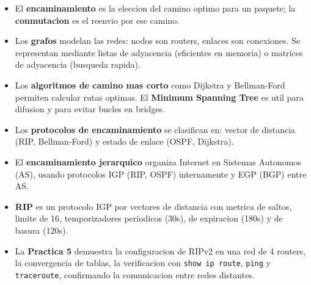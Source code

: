 \begin{itemize}
    \item El \textbf{encaminamiento} es la eleccion del camino optimo para un paquete;
    la \textbf{conmutacion} es el reenvio por ese camino.
    \item Los \textbf{grafos} modelan las redes: nodos son routers, enlaces son conexiones.
    Se representan mediante listas de adyacencia (eficientes en memoria) o
    matrices de adyacencia (busqueda rapida).
    \item Los \textbf{algoritmos de camino mas corto} como Dijkstra y Bellman-Ford
    permiten calcular rutas optimas. El \textbf{Minimum Spanning Tree} es util
    para difusion y para evitar bucles en bridges.
    \item Los \textbf{protocolos de encaminamiento} se clasifican en: vector de
    distancia (RIP, Bellman-Ford) y estado de enlace (OSPF, Dijkstra).
    \item El \textbf{encaminamiento jerarquico} organiza Internet en Sistemas
    Autonomos (AS), usando protocolos IGP (RIP, OSPF) internamente y EGP (BGP)
    entre AS.
    \item \textbf{RIP} es un protocolo IGP por vectores de distancia con metrica de
    saltos, limite de 16, temporizadores periodicos (30s), de expiracion (180s)
    y de basura (120s).
    \item La \textbf{Practica 5} demuestra la configuracion de RIPv2 en una red de 4
    routers, la convergencia de tablas, la verificacion con \texttt{show ip route},
    \texttt{ping} y \texttt{traceroute}, confirmando la comunicacion entre redes distantes.
\end{itemize}
